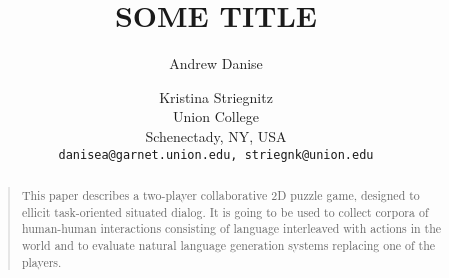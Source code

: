 \documentclass[letterpaper]{article}
\begin{document}
%
\title{SOME TITLE}
\author{
Andrew Danise \and Kristina Striegnitz\\
Union College\\
Schenectady, NY, USA\\
\texttt{danisea@garnet.union.edu, striegnk@union.edu}
}
\maketitle
\begin{abstract}
\begin{quote}
This paper describes a two-player collaborative 2D puzzle game,
designed to ellicit task-oriented situated dialog. It is going to be
used to collect corpora of human-human interactions consisting of
language interleaved with actions in the world and to evaluate natural
language generation systems replacing one of the players.
\end{quote}
\end{abstract}











\end{document}
